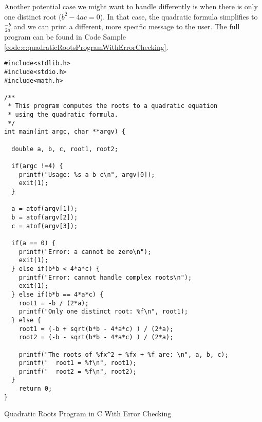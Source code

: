 Another potential case we might want to handle differently is when there is only
one distinct root ($b^2 - 4ac = 0$).  In that case, the quadratic formula simplifies 
to $\frac{-b}{2a}$ and we can print a different, more specific message to the user.
The full program can be found in Code Sample \ref{code:c:quadraticRootsProgramWithErrorChecking}.


\begin{listing}[h]
\begin{verbatim}
#include<stdlib.h>
#include<stdio.h>
#include<math.h>

/**
 * This program computes the roots to a quadratic equation
 * using the quadratic formula.
 */
int main(int argc, char **argv) {

  double a, b, c, root1, root2;

  if(argc !=4) {
    printf("Usage: %s a b c\n", argv[0]);
    exit(1);
  }

  a = atof(argv[1]);
  b = atof(argv[2]);
  c = atof(argv[3]);
  
  if(a == 0) {
    printf("Error: a cannot be zero\n");
    exit(1);
  } else if(b*b < 4*a*c) {
    printf("Error: cannot handle complex roots\n");
    exit(1);
  } else if(b*b == 4*a*c) {
    root1 = -b / (2*a);
    printf("Only one distinct root: %f\n", root1);
  } else {
    root1 = (-b + sqrt(b*b - 4*a*c) ) / (2*a);
    root2 = (-b - sqrt(b*b - 4*a*c) ) / (2*a);
  
    printf("The roots of %fx^2 + %fx + %f are: \n", a, b, c);
    printf("  root1 = %f\n", root1);
    printf("  root2 = %f\n", root2);
  }
    return 0;
}
\end{verbatim}
\caption{Quadratic Roots Program in C With Error Checking}
\label{code:c:quadraticRootsProgramWithErrorChecking}
\end{listing}
